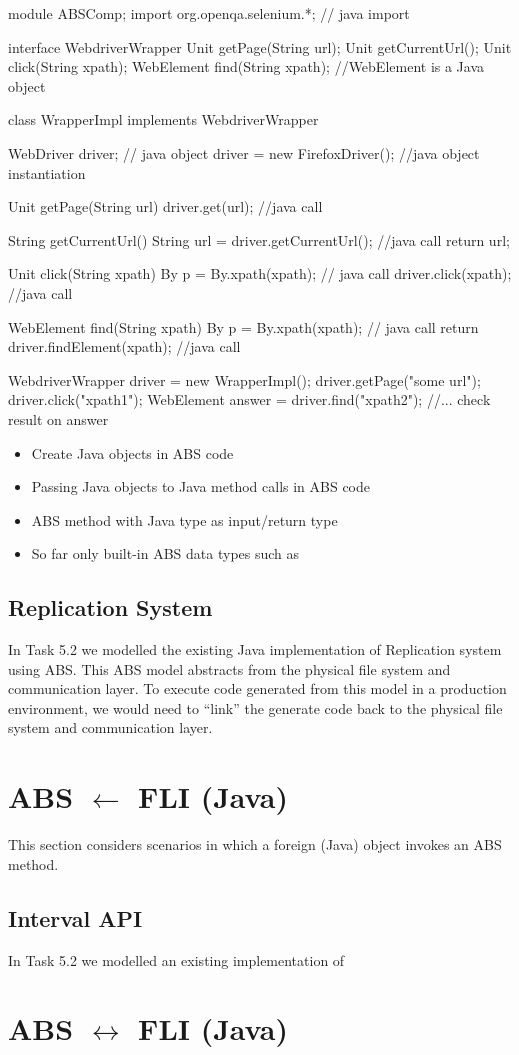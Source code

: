 \documentclass[a4paper,11pt,final]{article}
\begin{document}
\begin{absexamplen}
module ABSComp;
import org.openqa.selenium.*; // java import

interface WebdriverWrapper {
  Unit getPage(String url); 
  Unit getCurrentUrl();
  Unit click(String xpath);
  WebElement find(String xpath); //WebElement is a Java object
}

class WrapperImpl implements WebdriverWrapper {
  WebDriver driver; // java object
  {
    driver = new FirefoxDriver(); //java object instantiation
  }
  
  Unit getPage(String url) {
    driver.get(url); //java call
  }
	
  String getCurrentUrl() {
    String url = driver.getCurrentUrl(); //java call
    return url;
  }
  
  Unit click(String xpath) {
     By p = By.xpath(xpath); // java call
     driver.click(xpath); //java call
  }
  
  WebElement find(String xpath) {
     By p = By.xpath(xpath); // java call
     return driver.findElement(xpath); //java call
  }
}

{
   WebdriverWrapper driver = new WrapperImpl();
   driver.getPage("some url");
   driver.click("xpath1");
   WebElement answer = driver.find("xpath2");
   //... check result on answer
}
\end{absexamplen}

\begin{itemize}
  \item Create Java objects in ABS code
  \item Passing Java objects to Java method calls in ABS code 
  \item ABS method with Java type as input/return type
  \item So far only built-in ABS data types such as 
\end{itemize}

\subsection{Replication System}
In Task 5.2 we modelled the existing Java implementation of Replication system
using ABS. This ABS model abstracts from the physical file system and
communication layer. To execute code generated from this model in a production
environment, we would need to ``link'' the generate code back to the physical
file system and communication layer.

\begin{absexamplen}

\end{absexamplen}


\section{ABS $\leftarrow$ FLI (Java)}
This section considers scenarios in which a foreign (Java) object invokes an
ABS method.

\subsection{Interval API}
In Task 5.2 we modelled an existing implementation of 


\section{ABS $\leftrightarrow$ FLI (Java)}
\end{document}
